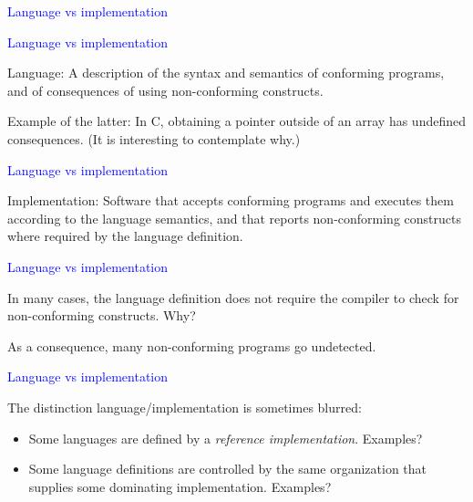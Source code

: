 \documentclass{slides}
\newcommand{\ti}[1]{\begin{center}\Large{\textcolor{blue}{#1}}\end{center}}
\begin{document}
\begin{slide}\ti{Language vs implementation}

\vfill\end{slide}
\begin{slide}\ti{Language vs implementation}

Language: A description of the syntax and semantics of conforming
programs, and of consequences of using non-conforming constructs.

Example of the latter: In C, obtaining a pointer outside of an array
has undefined consequences.  (It is interesting to contemplate why.)

\vfill\end{slide}
\begin{slide}\ti{Language vs implementation}

Implementation: Software that accepts conforming programs and executes
them according to the language semantics, and that reports
non-conforming constructs where required by the language definition.

\vfill\end{slide}
\begin{slide}\ti{Language vs implementation}

In many cases, the language definition does not require the compiler
to check for non-conforming constructs.  Why?

As a consequence, many non-conforming programs go undetected.

\vfill\end{slide}
\begin{slide}\ti{Language vs implementation}

The distinction language/implementation is sometimes blurred:

\begin{itemize}
\item Some languages are defined by a \emph{reference
  implementation}.  Examples?
\item Some language definitions are controlled by the same
  organization that supplies some dominating implementation.
  Examples?
\end{itemize}

\vfill\end{slide}
\end{document}
